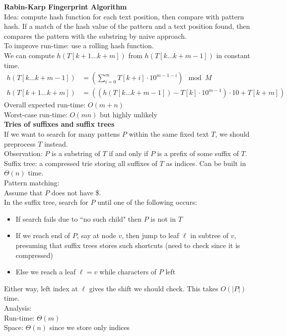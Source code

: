 \documentclass[12pt]{article}
\begin{document}
{\textbf{Rabin-Karp Fingerprint Algorithm}\\
Idea: compute hash function for each text position, then compare with pattern hash. If a match of the hash value of the pattern and a text position found, then compares the pattern with the substring by naive approach. \\
To improve run-time: use a rolling hash function.\\
We can compute $h(T[k+1\dots k+m])$ from $h(T[k\dots k+m-1])$ in constant time. 
\begin{align*}
 h(T[k\dots k+m-1]) &= (\sum_{i=0}^{m}T[k+i]\cdot 10^{m-1-i}) \mod M\\
h(T[k+1\dots k+m]) &= ((h(T[k\dots k+m-1]) - T[k]\cdot 10^{m-1}  ) \cdot 10 + T[k+m])
\end{align*}
Overall expected run-time: $O(m+n)$\\ 
Worst-case run-time: $O(mn)$ but highly unlikely\\

\textbf{Tries of suffixes and suffix trees}\\

If we want to search for many pattens $P$ within the same fixed text $T$, we should preprocess $T$ instead. \\
Observation: $P$ is a substring of $T$ if and only if $P$ is a prefix of some suffix of $T$. \\
Suffix tree: a compressed trie storing all suffixes of $T$ as indices. Can be built in $\Theta(n)$ time. \\

Pattern matching:\\
Assume that $P$ does not have \$. \\
In the suffix tree, search for $P$ until one of the following occurs:
\begin{itemize}
	\renewcommand\labelitemi{--}
	\item If search fails due to ``no such child" then $P$ is not in $T$
	\item If we reach end of $P$, say at node $v$, then jump to leaf $\ell$ in subtree of $v$, presuming that suffix trees stores such shortcuts (need to check since it is compressed)
	\item Else we reach a leaf $\ell=v$ while characters of $P$ left
\end{itemize}
Either way, left index at $\ell$ gives the shift we should check. This takes $O(|P|)$ time. \\

Analysis:\\
Run-time: $\Theta (m)$\\
Space: $\Theta(n)$ since we store only indices\\

}
\end{document}
